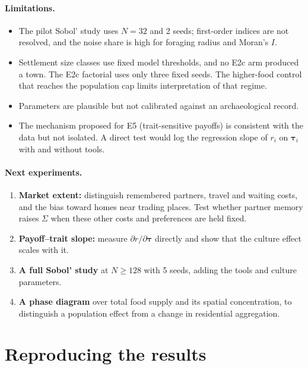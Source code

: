 \documentclass[11pt]{article}
\theoremstyle{definition}
\newcommand{\1}{\mathbf{1}}
\begin{document}
\paragraph{Limitations.}
\begin{itemize}
\item The pilot Sobol' study uses $N=32$ and 2 seeds; first-order indices are not resolved, and the noise share is high for foraging radius and Moran's $I$.
\item Settlement size classes use fixed model thresholds, and no E2c arm produced a town. The E2c factorial uses only three fixed seeds. The higher-food control that reaches the population cap limits interpretation of that regime.
\item Parameters are plausible but not calibrated against an archaeological record.
\item The mechanism proposed for E5 (trait-sensitive payoffs) is consistent with the data but not isolated. A direct test would log the regression slope of $r_i$ on $\boldsymbol\tau_i$ with and without tools.
\end{itemize}

\paragraph{Next experiments.}
\begin{enumerate}
\item \textbf{Market extent:} distinguish remembered partners, travel and waiting costs, and the bias toward homes near trading places. Test whether partner memory raises $\Sigma$ when these other costs and preferences are held fixed.
\item \textbf{Payoff--trait slope:} measure $\partial r/\partial\boldsymbol\tau$ directly and show that the culture effect scales with it.
\item \textbf{A full Sobol' study} at $N\ge128$ with 5 seeds, adding the tools and culture parameters.
\item \textbf{A phase diagram} over total food supply and its spatial concentration, to distinguish a population effect from a change in residential aggregation.
\end{enumerate}

\section{Reproducing the results}
\end{document}
